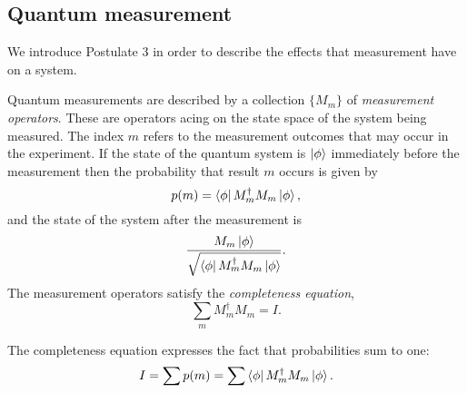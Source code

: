 \documentclass{article}
\begin{document}
\subsection{Quantum measurement}

We introduce Postulate 3 in order to describe the effects that measurement have on a system.

\begin{postulate}
  Quantum measurements are described by a collection $\{M_m\}$ of \textit{measurement operators}. These are operators acing on the state space of the system being measured. The index $m$ refers to the measurement outcomes that may occur in the experiment. If the state of the quantum system is $\ket\phi$ immediately before the measurement then the probability that result $m$ occurs is given by
  \[p(m)=\bra{\phi}M_m^\dagger M_m\ket{\phi},\]
  and the state of the system after the measurement is
  \[\frac{M_m\ket{\phi}}{\sqrt{\bra\phi M_m^\dagger M_m\ket\phi}}.\]
  The measurement operators satisfy the \textit{completeness equation},
  \[\sum_m M_m^\dagger M_m = I.\]
\end{postulate}

The completeness equation expresses the fact that probabilities sum to one:
\[I=\sum p(m)=\sum \bra\phi M^\dagger_m M_m\ket\phi.\]
\end{document}
